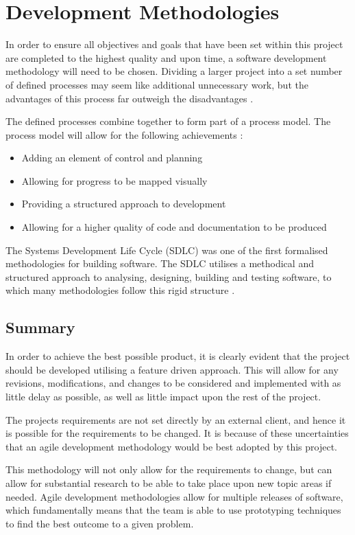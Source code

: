 \chapter{Development Methodologies}
\label{cha:development_methods}

In order to ensure all objectives and goals that have been set within this 
project are completed to the highest quality and upon time, a software 
development methodology will need to be chosen. Dividing a larger project into 
a set number of defined processes may seem like additional unnecessary work, 
but the advantages of this process far outweigh the disadvantages 
\citep{knott_dawson99}.

The defined processes combine together to form part of a process model. The 
process model will allow for the following achievements \citep{knott_dawson99}:

\begin{itemize}
  \item Adding an element of control and planning
  \item Allowing for progress to be mapped visually
  \item Providing a structured approach to development
  \item Allowing for a higher quality of code and documentation to be produced
\end{itemize}

The Systems Development Life Cycle (SDLC) was one of the first formalised 
methodologies for building software. The SDLC utilises a methodical and 
structured approach to analysing, designing, building and testing software, to 
which many methodologies follow this rigid structure \citep{elliott04}. 


\newpage



\newpage



\newpage



\newpage



\section{Summary}
In order to achieve the best possible product, it is clearly evident that the 
project should be developed utilising a feature driven approach. This will 
allow for any revisions, modifications, and changes to be considered and 
implemented with as little delay as possible, as well as little impact upon the
rest of the project.

The projects requirements are not set directly by an external client, and hence
it is possible for the requirements to be changed. It is because of these 
uncertainties that an agile development methodology would be best adopted by 
this project.

This methodology will not only allow for the requirements to change, but can 
allow for substantial research to be able to take place upon new topic areas if
needed. Agile development methodologies allow for multiple releases of 
software, which fundamentally means that the team is able to use prototyping 
techniques to find the best outcome to a given problem.

